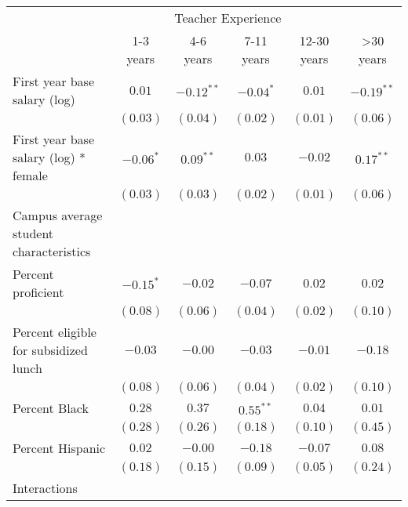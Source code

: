 \documentclass[12pt,]{article}
\begin{document}
\begin{table}
\begin{center}
\begin{tabular}{l c c c c c }
\hline
 & \multicolumn{4}{c}{Teacher Experience} \\ \cline{2-6}
 & 1-3 years & 4-6 years & 7-11 years & 12-30 years & >30 years \\
\hline
First year base salary (log)                & $0.01$       & $-0.12^{**}$  & $-0.04^{*}$ & $0.01$       & $-0.19^{**}$ \\
                                            & $(0.03)$     & $(0.04)$      & $(0.02)$    & $(0.01)$     & $(0.06)$     \\
First year base salary (log) * female       & $-0.06^{*}$  & $0.09^{**}$   & $0.03$      & $-0.02$      & $0.17^{**}$  \\
                                            & $(0.03)$     & $(0.03)$      & $(0.02)$    & $(0.01)$     & $(0.06)$     \\
Campus average student characteristics      &              &               &             &              &              \\
\quad Percent proficient                    & $-0.15^{*}$  & $-0.02$       & $-0.07$     & $0.02$       & $0.02$       \\
                                            & $(0.08)$     & $(0.06)$      & $(0.04)$    & $(0.02)$     & $(0.10)$     \\
\quad Percent eligible for subsidized lunch & $-0.03$      & $-0.00$       & $-0.03$     & $-0.01$      & $-0.18$      \\
                                            & $(0.08)$     & $(0.06)$      & $(0.04)$    & $(0.02)$     & $(0.10)$     \\
\quad Percent Black                         & $0.28$       & $0.37$        & $0.55^{**}$ & $0.04$       & $0.01$       \\
                                            & $(0.28)$     & $(0.26)$      & $(0.18)$    & $(0.10)$     & $(0.45)$     \\
\quad Percent Hispanic                      & $0.02$       & $-0.00$       & $-0.18$     & $-0.07$      & $0.08$       \\
                                            & $(0.18)$     & $(0.15)$      & $(0.09)$    & $(0.05)$     & $(0.24)$     \\
Interactions                                &              &               &             &              &              \\

\end{tabular}
\end{center}
\end{table}
\end{document}
